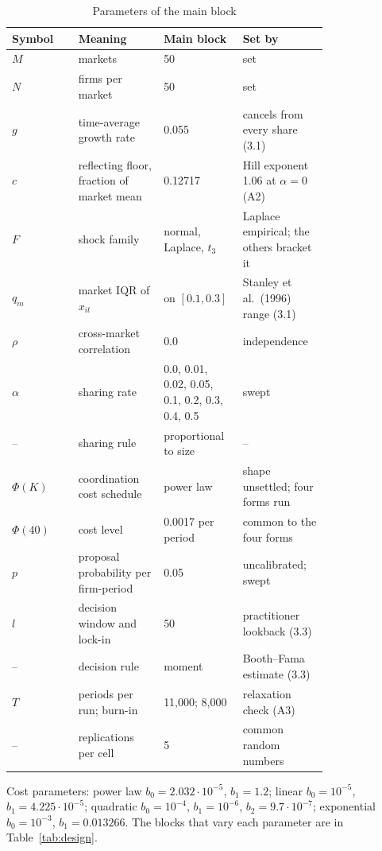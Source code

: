 \begin{table}[htbp]
\centering
\caption{Parameters of the main block}
\label{tab:parameters}
\small
\begin{tabular}{lp{0.27\linewidth}p{0.25\linewidth}p{0.27\linewidth}}
\toprule
Symbol & Meaning & Main block & Set by \\
\midrule
$M$ & markets & 50 & set \\
$N$ & firms per market & 50 & set \\
$g$ & time-average growth rate & 0.055 & cancels from every share (3.1) \\
$c$ & reflecting floor, fraction of market mean & 0.12717 & Hill exponent 1.06 at $\alpha = 0$ (A2) \\
$F$ & shock family & normal, Laplace, $t_3$ & Laplace empirical; the others bracket it \\
$q_m$ & market IQR of $x_{it}$ & on $[0.1, 0.3]$ & Stanley et al.\ (1996) range (3.1) \\
$\rho$ & cross-market correlation & 0.0 & independence \\
$\alpha$ & sharing rate & 0.0, 0.01, 0.02, 0.05, 0.1, 0.2, 0.3, 0.4, 0.5 & swept \\
-- & sharing rule & proportional to size & -- \\
$\Phi(K)$ & coordination cost schedule & power law & shape unsettled; four forms run \\
$\Phi(40)$ & cost level & 0.0017 per period & common to the four forms \\
$p$ & proposal probability per firm-period & 0.05 & uncalibrated; swept \\
$l$ & decision window and lock-in & 50 & practitioner lookback (3.3) \\
-- & decision rule & moment & Booth--Fama estimate (3.3) \\
$T$ & periods per run; burn-in & 11,000; 8,000 & relaxation check (A3) \\
-- & replications per cell & 5 & common random numbers \\
\bottomrule
\end{tabular}
\par\smallskip\begin{minipage}{0.95\linewidth}\footnotesize Cost parameters: power law $b_0 = 2.032\cdot10^{-5}$, $b_1 = 1.2$; linear $b_0 = 10^{-5}$, $b_1 = 4.225\cdot10^{-5}$; quadratic $b_0 = 10^{-4}$, $b_1 = 10^{-6}$, $b_2 = 9.7\cdot10^{-7}$; exponential $b_0 = 10^{-3}$, $b_1 = 0.013266$. The blocks that vary each parameter are in Table~\ref{tab:design}.\end{minipage}
\end{table}
